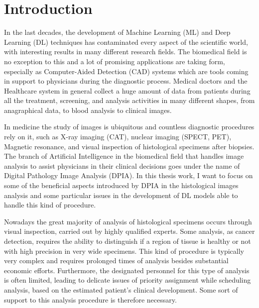 \chapter*{Introduction}
In the last decades, the development of Machine Learning (ML) and Deep Learning (DL) techniques has contaminated every aspect of the scientific world, with interesting results in many different research fields. The biomedical field is no exception to this and a lot of promising applications are taking form, especially as Computer-Aided Detection (CAD) systems which are tools coming in support to physicians during the diagnostic process. Medical doctors and the Healthcare system in general collect a huge amount of data from patients during all the treatment, screening, and analysis activities in many different shapes, from anagraphical data, to blood analysis to clinical images.

In medicine the study of images is ubiquitous and countless diagnostic procedures rely on it, such as X-ray imaging (CAT), nuclear imaging (SPECT, PET), Magnetic resonance, and visual inspection of histological specimens after biopsies. The branch of Artificial Intelligence in the biomedical field that handles image analysis to assist physicians in their clinical decisions goes under the name of Digital Pathology Image Analysis (DPIA).
In this thesis work, I want to focus on some of the beneficial aspects introduced by DPIA in the histological images analysis and some particular issues in the development of DL models able to handle this kind of procedure.

Nowadays the great majority of analysis of histological specimens occurs through visual inspection, carried out by highly qualified experts. Some analysis, as cancer detection, requires the ability to distinguish if a region of tissue is healthy or not with high precision in very wide specimens. This kind of procedure is typically very complex and requires prolonged times of analysis besides substantial economic efforts. Furthermore, the designated personnel for this type of analysis is often limited, leading to delicate issues of priority assignment while scheduling analysis, based on the estimated patient's clinical development. Some sort of support to this analysis procedure is therefore necessary.

